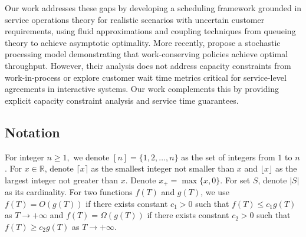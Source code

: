 \documentclass[poms,final,blindrev]{poms1_V1} %
\begin{document}
Our work addresses these gaps by developing a scheduling framework grounded in service operations theory for realistic scenarios with uncertain customer requirements, using fluid approximations and coupling techniques from queueing theory to achieve asymptotic optimality. More recently, \citet{li2025throughput} propose a stochastic processing model demonstrating that work-conserving policies achieve optimal throughput. However, their analysis does not address capacity constraints from work-in-process or explore customer wait time metrics critical for service-level agreements in interactive systems. Our work complements this by providing explicit capacity constraint analysis and service time guarantees.

\subsection{Notation}
For integer $n\ge 1,$ we denote $[n]=\{1,2,\dots,n\}$ as the set of integers from $1$ to $n$. For $x\in\mathbb{R}$, denote $\lceil x\rceil$ as the smallest integer not smaller than $x$ and $\lfloor x\rfloor$ as the largest integer not greater than $x$. Denote $x_+=\max\{x, 0\}$. For set $S$, denote $|S|$ as its cardinality. For two functions $f(T)$ and $g(T)$, we use $f(T)=O(g(T))$ if there exists constant $c_1>0$ such that $f(T)\le c_1g(T)$ as $T\to+\infty$ and $f(T)=\Omega(g(T))$ if there exists constant $c_2>0$ such that $f(T)\ge c_2g(T)$ as $T\to +\infty$.
















\end{document}
